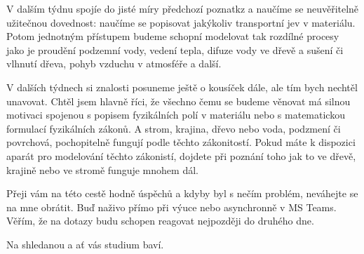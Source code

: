 \documentclass[12pt]{article}
\begin{document}
V dalším týdnu spojíe do jisté míry předchozí poznatkz a naučíme se neuvěřitelně užitečnou dovednost: naučíme se popisovat jakýkoliv transportní jev v materiálu. Potom jednotným přístupem budeme schopní modelovat tak rozdílné procesy jako je proudění podzemní vody, vedení tepla, difuze vody ve dřevě a sušení či vlhnutí dřeva, pohyb vzduchu v atmosféře a další.

V dalších týdnech si znalosti posuneme ještě o kousíček dále, ale tím bych nechtěl unavovat. Chtěl jsem hlavně říci, že všechno čemu se budeme věnovat má silnou motivaci spojenou s popisem fyzikálních polí v materiálu nebo s matematickou formulací fyzikálních zákonů. A strom, krajina, dřevo nebo voda, podzmení či povrchová, pochopitelně fungují podle těchto zákonitostí. Pokud máte k dispozici aparát pro modelování těchto zákonistí, dojdete při poznání toho jak to ve dřevě, krajině nebo ve stromě funguje mnohem dál.

Přeji vám na této cestě hodně úspěchů a kdyby byl s nečím problém, neváhejte se na mne obrátit. Buď naživo přímo při výuce nebo asynchronně v MS Teams. Věřím, že na dotazy budu schopen reagovat nejpozději do druhého dne.

Na shledanou a ať vás studium baví.
\end{document}
